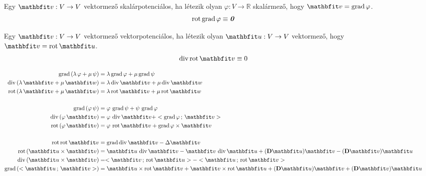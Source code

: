 \documentclass[lang=magyar]{math-handout}
\begin{document}
\begin{block}

  Egy $\rvec v: V \rightarrow V$ vektormező skalárpotenciálos, ha létezik olyan
  $\varphi: V \rightarrow \mathbb R$ skalármező, hogy $\rvec v = \grad \varphi$.
  \[
    \operatorname{rot} \operatorname{grad} \varphi \equiv \text{\textbf{\textit{0}}}
  \]


  Egy $\rvec v: V \rightarrow V$ vektormező vektorpotenciálos, ha létezik olyan
  $\rvec u: V \rightarrow V$ vektormező, hogy $\rvec v = \rot \rvec u$.
  \[
    \Div \rot \rvec v \equiv 0
  \]

  \begin{align*}
    \grad \left( \lambda \, \varphi + \mu \, \psi \right)
     & =
    \lambda \grad \varphi + \mu \grad \psi
    \\
    \Div \left( \lambda \, \rvec v + \mu \, \rvec w \right)
     & =
    \lambda \Div \rvec v + \mu \Div \rvec w
    \\
    \rot \left( \lambda \, \rvec v + \mu \, \rvec w \right)
     & =
    \lambda \rot \rvec v + \mu \rot \rvec w
    \\[
    5mm
    ]
    \grad \left( \varphi \, \psi \right)
     & =
    \varphi \, \grad \psi + \psi \, \grad \varphi
    \\
    \Div \left( \varphi \, \rvec v \right)
     & =
    \varphi \, \Div \rvec v + \scalar{\grad \varphi}{\rvec v}
    \\
    \rot \left( \varphi \, \rvec v \right)
     & =
    \varphi \, \rot \rvec v + \grad \varphi \times \rvec v
    \\[
    5mm
    ]
    \rot \rot \rvec v
     & =
    \grad \Div \rvec v - \Delta \rvec v
    \\
    \rot \left( \rvec u \times \rvec v \right)
     & =
    \rvec u \, \Div \rvec v - \rvec v \, \Div \rvec u
    + (\Diff \rvec u) \rvec v - (\Diff \rvec v) \rvec u
    \\
    \Div \left( \rvec u \times \rvec v \right)
     & =
    \scalar{\rvec v}{\rot \rvec u} - \scalar{\rvec u}{\rot \rvec v}
    \\
    \grad \left( \scalar{\rvec u}{\rvec v} \right)
     & =
    \rvec u \times \rot \rvec v + \rvec v \times \rot \rvec u
    + (\Diff \rvec u) \rvec v + (\Diff \rvec v) \rvec u
  \end{align*}
\end{block}
\end{document}
